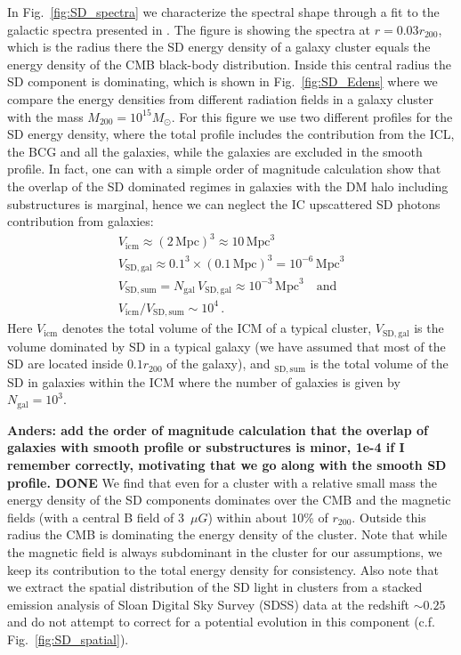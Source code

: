 \documentclass[10pt,aps,pra,reprint,amsmath,amsfonts,amssymb,showpacs,nofootinbib,floatfix]{revtex4-1}
\newcommand{\rmn}{\mathrm}
\newcommand{\msun}{M_\odot}
\newcommand{\mpc}{\rmn{Mpc}}
\newcommand{\rvir}{r_{200}}
\newcommand{\mvir}{M_{200}}
\begin{document}
In Fig.~\ref{fig:SD_spectra} we characterize the spectral shape
through a fit to the galactic spectra presented in
\cite{2006ApJ...648L..29P}.  The figure is showing the spectra at
$r=0.03\rvir$, which is the radius there the SD energy density of a
galaxy cluster equals the energy density of the CMB black-body
distribution. Inside this central radius the SD component is
dominating, which is shown in Fig.~\ref{fig:SD_Edens} where we compare
the energy densities from different radiation fields in a galaxy
cluster with the mass $\mvir=10^{15}\msun$. For this figure we use two
different profiles for the SD energy density, where the total profile
includes the contribution from the ICL, the BCG and all the galaxies,
while the galaxies are excluded in the smooth profile. In fact, one
can with a simple order of magnitude calculation show that the overlap
of the SD dominated regimes in galaxies with the DM halo including
substructures is marginal, hence we can neglect the IC upscattered SD
photons contribution from galaxies:
\begin{eqnarray}
V_\rmn{icm} \approx (2\,\mpc)^3\approx 10\,\mpc^3\nonumber\\
V_\rmn{SD,gal} \approx 0.1^3\times(0.1\,\mpc)^3 = 10^{-6}\,\mpc^3\nonumber\\
V_\rmn{SD,sum} = N_\rmn{gal}\,V_\rmn{SD,gal} \approx 10^{-3}\,\mpc^3
\quad\rmn{and}\nonumber\\
V_\rmn{icm}/V_\rmn{SD,sum} \sim 10^4 \nonumber\,.
\end{eqnarray}
Here $V_\rmn{icm}$ denotes the total volume of the ICM of a typical
cluster, $V_\rmn{SD,gal}$ is the volume dominated by SD in a typical
galaxy (we have assumed that most of the SD are located inside
$0.1\rvir$ of the galaxy), and $_\rmn{SD,sum}$ is the total volume of
the SD in galaxies within the ICM where the number of galaxies is
given by $ N_\rmn{gal}=10^3$.

 {\bf Anders: add the order of
  magnitude calculation that the overlap of galaxies with smooth
  profile or substructures is minor, 1e-4 if I remember correctly,
  motivating that we go along with the smooth SD profile. DONE}  We find
that even for a cluster with a relative small mass the energy density
of the SD components dominates over the CMB and the magnetic fields
(with a central B field of 3~$\mu G$) within about 10\% of
$\rvir$. Outside this radius the CMB is dominating the energy density
of the cluster.  Note that while the magnetic field is always
subdominant in the cluster for our assumptions, we keep its
contribution to the total energy density for consistency. Also note
that we extract the spatial distribution of the SD light in clusters
from a stacked emission analysis of Sloan Digital Sky Survey (SDSS)
data at the redshift $\sim 0.25$ \cite{2005MNRAS.358..949Z} and do not
attempt to correct for a potential evolution in this component
(c.f. Fig.~\ref{fig:SD_spatial}).
\end{document}
